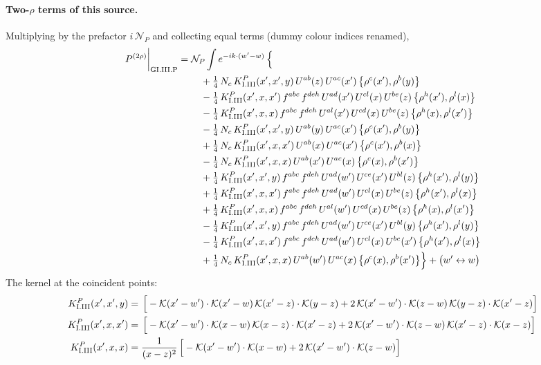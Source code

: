 \documentclass[10pt]{article}
\numberwithin{equation}{section}
\newcommand{\KK}{\mathcal K}
\newcommand{\NP}{\mathcal N_{P}}
\begin{document}
\paragraph{Two-$\rho$ terms of this source.} Multiplying by the prefactor $i\,\NP$ and collecting equal terms (dummy colour indices renamed),
\begin{align}
P^{(2\rho)}\bigg|_{\rm GI.III.P}={}&\NP\int e^{-ik\cdot(w'-w)}\,\Big\{\notag\\
&\quad +\tfrac14\,N_{c}\,K^{P}_{\rm I.III}(x',x',y)\,U^{ab}(z)\,U^{ac}(x')\,\big\{\rho^{c}(x'),\rho^{b}(y)\big\}\notag\\
&\quad -\tfrac14\,K^{P}_{\rm I.III}(x',x,x')\,f^{abc}\,f^{deh}\,U^{ad}(x')\,U^{cl}(x)\,U^{be}(z)\,\big\{\rho^{h}(x'),\rho^{l}(x)\big\}\notag\\
&\quad -\tfrac14\,K^{P}_{\rm I.III}(x',x,x)\,f^{abc}\,f^{deh}\,U^{al}(x')\,U^{cd}(x)\,U^{be}(z)\,\big\{\rho^{h}(x),\rho^{l}(x')\big\}\notag\\
&\quad -\tfrac14\,N_{c}\,K^{P}_{\rm I.III}(x',x',y)\,U^{ab}(y)\,U^{ac}(x')\,\big\{\rho^{c}(x'),\rho^{b}(y)\big\}\notag\\
&\quad +\tfrac14\,N_{c}\,K^{P}_{\rm I.III}(x',x,x')\,U^{ab}(x)\,U^{ac}(x')\,\big\{\rho^{c}(x'),\rho^{b}(x)\big\}\notag\\
&\quad -\tfrac14\,N_{c}\,K^{P}_{\rm I.III}(x',x,x)\,U^{ab}(x')\,U^{ac}(x)\,\big\{\rho^{c}(x),\rho^{b}(x')\big\}\notag\\
&\quad +\tfrac14\,K^{P}_{\rm I.III}(x',x',y)\,f^{abc}\,f^{deh}\,U^{ad}(w')\,U^{ce}(x')\,U^{bl}(z)\,\big\{\rho^{h}(x'),\rho^{l}(y)\big\}\notag\\
&\quad +\tfrac14\,K^{P}_{\rm I.III}(x',x,x')\,f^{abc}\,f^{deh}\,U^{ad}(w')\,U^{cl}(x)\,U^{be}(z)\,\big\{\rho^{h}(x'),\rho^{l}(x)\big\}\notag\\
&\quad +\tfrac14\,K^{P}_{\rm I.III}(x',x,x)\,f^{abc}\,f^{deh}\,U^{al}(w')\,U^{cd}(x)\,U^{be}(z)\,\big\{\rho^{h}(x),\rho^{l}(x')\big\}\notag\\
&\quad -\tfrac14\,K^{P}_{\rm I.III}(x',x',y)\,f^{abc}\,f^{deh}\,U^{ad}(w')\,U^{ce}(x')\,U^{bl}(y)\,\big\{\rho^{h}(x'),\rho^{l}(y)\big\}\notag\\
&\quad -\tfrac14\,K^{P}_{\rm I.III}(x',x,x')\,f^{abc}\,f^{deh}\,U^{ad}(w')\,U^{cl}(x)\,U^{be}(x')\,\big\{\rho^{h}(x'),\rho^{l}(x)\big\}\notag\\
&\quad +\tfrac14\,N_{c}\,K^{P}_{\rm I.III}(x',x,x)\,U^{ab}(w')\,U^{ac}(x)\,\big\{\rho^{c}(x),\rho^{b}(x')\big\}\Big\}+\big(w'\leftrightarrow w\big)\label{B:eq:res-GI.III.P}
\end{align}
The kernel at the coincident points:
\begin{align*}
K^{P}_{\rm I.III}(x',x',y)&=\,\Big[-\KK(x'-w')\cdot\KK(x'-w)\,\KK(x'-z)\cdot\KK(y-z)+2\,\KK(x'-w')\cdot\KK(z-w)\,\KK(y-z)\cdot\KK(x'-z)\Big]\\K^{P}_{\rm I.III}(x',x,x')&=\,\Big[-\KK(x'-w')\cdot\KK(x-w)\,\KK(x-z)\cdot\KK(x'-z)+2\,\KK(x'-w')\cdot\KK(z-w)\,\KK(x'-z)\cdot\KK(x-z)\Big]\\K^{P}_{\rm I.III}(x',x,x)&=\frac{1}{(x-z)^2}\,\Big[-\KK(x'-w')\cdot\KK(x-w)+2\,\KK(x'-w')\cdot\KK(z-w)\Big]
\end{align*}
\end{document}
